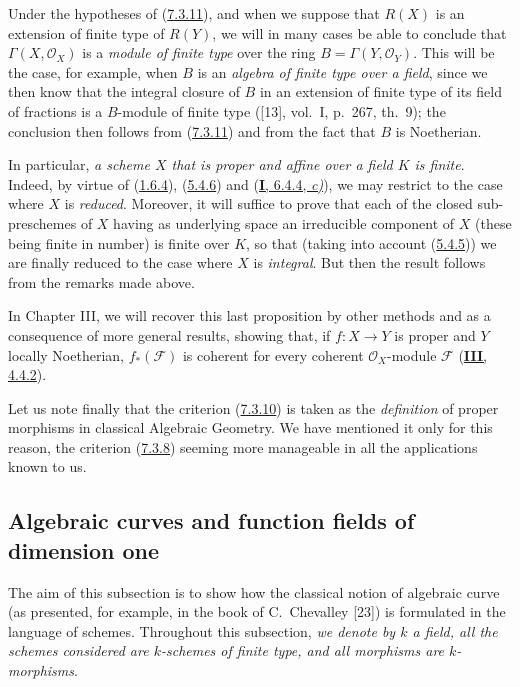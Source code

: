 \begin{remark}[7.3.12]
\label{II.7.3.12}
Under the hypotheses of (\hyperref[II.7.3.11]{7.3.11}), and when we suppose
that $R(X)$ is an extension of finite type of $R(Y)$, we will in many
cases be able to conclude that $\Gamma(X,\mathcal{O}_X)$ is a \emph{module of
finite type} over the ring $B=\Gamma(Y,\mathcal{O}_Y)$. This will be the case,
for example, when $B$ is an \emph{algebra of finite type over a field}, since
we then know that the integral closure of $B$ in an extension of finite type
of its field of fractions is a $B$-module of finite type ([13], vol.~I, p.~267,
th.~9); the conclusion then follows from (\hyperref[II.7.3.11]{7.3.11}) and
from the fact that $B$ is Noetherian.

In particular, \emph{a scheme $X$ that is proper and affine over a field $K$ is
finite}. Indeed, by virtue of (\hyperref[II.1.6.4]{1.6.4}),
(\hyperref[II.5.4.6]{5.4.6}) and
(\hyperref[I.6.4.4]{\textbf{I}, 6.4.4, \emph{c)}}), we may restrict to the case where $X$ is
\emph{reduced}. Moreover, it will suffice to prove that each of the closed
sub-preschemes of $X$ having as underlying space an irreducible component of $X$
(these being finite in number) is finite over $K$, so that (taking into
account (\hyperref[II.5.4.5]{5.4.5})) we are finally reduced to the case
where $X$ is \emph{integral}. But then the result follows from the remarks made
above.

In Chapter III, we will recover this last proposition by other
methods and as a consequence of more general results, showing that, if
$f:X\to Y$ is proper and $Y$ locally Noetherian, $f_*(\mathcal{F})$ is
coherent for every coherent $\mathcal{O}_X$-module $\mathcal{F}$
(\hyperref[III.4.4.2]{\textbf{III}, 4.4.2}).

Let us note finally that the criterion (\hyperref[II.7.3.10]{7.3.10}) is
taken as the \emph{definition} of proper morphisms in classical Algebraic
Geometry. We have mentioned it only for this reason, the criterion
(\hyperref[II.7.3.8]{7.3.8}) seeming more manageable in all the
applications known to us.
\end{remark}



\subsection{Algebraic curves and function fields of dimension one}
\label{subsection:II.7.4}

The aim of this subsection is to show how the classical notion of algebraic
curve (as presented, for example, in the book of C.~Chevalley [23]) is
formulated in the language of schemes. Throughout this subsection, \emph{we
denote by $k$ a field, all the schemes considered are $k$-schemes of
finite type, and all morphisms are $k$-morphisms}.


